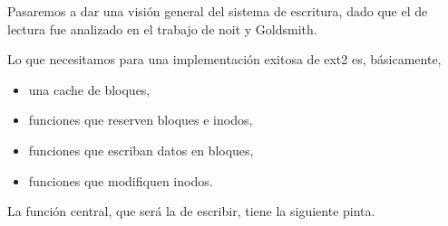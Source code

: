 Pasaremos a dar una visión general del sistema de escritura, dado que el de lectura fue analizado en el trabajo de noit y Goldsmith.

Lo que necesitamos para una implementación exitosa de ext2 es, básicamente,

\begin{itemize}
  \item una cache de bloques,
  \item funciones que reserven bloques e inodos,
  \item funciones que escriban datos en bloques,
  \item funciones que modifiquen inodos.
\end{itemize}

La función central, que será la de escribir, tiene la siguiente pinta.


